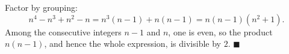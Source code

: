 Factor by grouping:
\[
n^4-n^3+n^2-n=n^3(n-1)+n(n-1)=n(n-1)(n^2+1).
\]
Among the consecutive integers $n-1$ and $n$, one is even, so the product $n(n-1)$, and hence the whole expression, is divisible by $2$. $\blacksquare$
